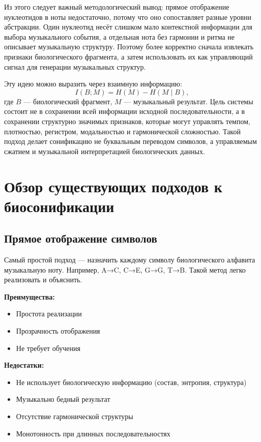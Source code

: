 Из этого следует важный методологический вывод: прямое отображение нуклеотидов в ноты недостаточно, потому что оно сопоставляет разные уровни абстракции. Один нуклеотид несёт слишком мало контекстной информации для выбора музыкального события, а отдельная нота без гармонии и ритма не описывает музыкальную структуру. Поэтому более корректно сначала извлекать признаки биологического фрагмента, а затем использовать их как управляющий сигнал для генерации музыкальных структур.

Эту идею можно выразить через взаимную информацию:
\begin{equation}
I(B;M) = H(M) - H(M \mid B),
\end{equation}
где \(B\) — биологический фрагмент, \(M\) — музыкальный результат. Цель системы состоит не в сохранении всей информации исходной последовательности, а в сохранении структурно значимых признаков, которые могут управлять темпом, плотностью, регистром, модальностью и гармонической сложностью. Такой подход делает сонификацию не буквальным переводом символов, а управляемым сжатием и музыкальной интерпретацией биологических данных.

\section{Обзор существующих подходов к биосонификации}

\subsection{Прямое отображение символов}

Самый простой подход — назначить каждому символу биологического алфавита музыкальную ноту. Например, A→C, C→E, G→G, T→B. Такой метод легко реализовать и объяснить.

\textbf{Преимущества:}
\begin{itemize}
\item Простота реализации
\item Прозрачность отображения
\item Не требует обучения
\end{itemize}

\textbf{Недостатки:}
\begin{itemize}
\item Не использует биологическую информацию (состав, энтропия, структура)
\item Музыкально бедный результат
\item Отсутствие гармонической структуры
\item Монотонность при длинных последовательностях
\end{itemize}

